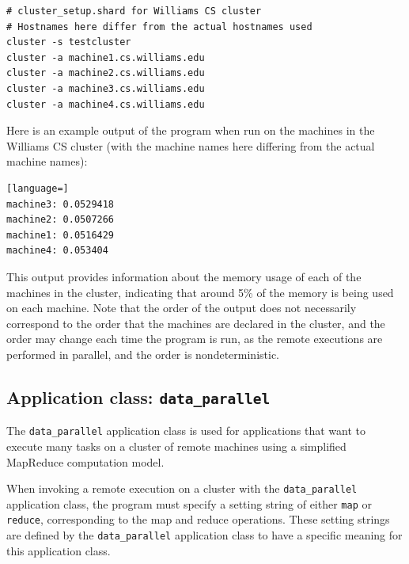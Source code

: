 \documentclass[oneside]{report}
\begin{document}
\begin{minipage}[c]{\textwidth-15pt}
  \begin{lstlisting}[language=Shard]
# cluster_setup.shard for Williams CS cluster 
# Hostnames here differ from the actual hostnames used
cluster -s testcluster
cluster -a machine1.cs.williams.edu
cluster -a machine2.cs.williams.edu
cluster -a machine3.cs.williams.edu
cluster -a machine4.cs.williams.edu
\end{lstlisting}
  \smallskip
\end{minipage}

Here is an example output of the program when run on the machines in the Williams CS cluster (with the machine names here differing from the actual machine names):

\begin{minipage}[c]{\textwidth-15pt}
  \begin{lstlisting}[language=]
machine3: 0.0529418
machine2: 0.0507266
machine1: 0.0516429
machine4: 0.053404
\end{lstlisting}
  \smallskip
\end{minipage}

This output provides information about the memory usage of each of the machines in the cluster, indicating that around 5\% of the memory is being used on each machine.
Note that the order of the output does not necessarily correspond to the order that the machines are declared in the cluster, and the order may change each time the program is run, as the remote executions are performed in parallel, and the order is nondeterministic.

\subsection{Application class: \texttt{data\_parallel}}

The \texttt{data\_parallel} application class is used for applications that want to execute many tasks on a cluster of remote machines using a simplified MapReduce computation model.

When invoking a remote execution on a cluster with the \texttt{data\_parallel} application class, the program must specify a setting string of either \texttt{map} or \texttt{reduce}, corresponding to the map and reduce operations.
These setting strings are defined by the \texttt{data\_parallel} application class to have a specific meaning for this application class.
\end{document}
